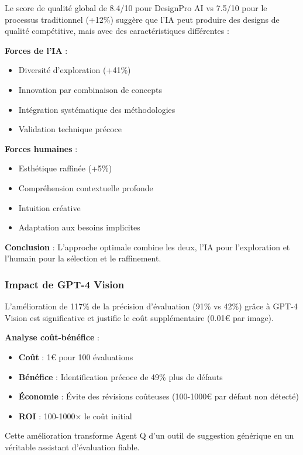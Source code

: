 Le score de qualité global de 8.4/10 pour DesignPro AI vs 7.5/10 pour le processus traditionnel (+12\%) suggère que l'IA peut produire des designs de qualité compétitive, mais avec des caractéristiques différentes :

\textbf{Forces de l'IA} :
\begin{itemize}[leftmargin=*]
    \item Diversité d'exploration (+41\%)
    \item Innovation par combinaison de concepts
    \item Intégration systématique des méthodologies
    \item Validation technique précoce
\end{itemize}

\textbf{Forces humaines} :
\begin{itemize}[leftmargin=*]
    \item Esthétique raffinée (+5\%)
    \item Compréhension contextuelle profonde
    \item Intuition créative
    \item Adaptation aux besoins implicites
\end{itemize}

\textbf{Conclusion} : L'approche optimale combine les deux, l'IA pour l'exploration et l'humain pour la sélection et le raffinement.

\subsubsection{Impact de GPT-4 Vision}

L'amélioration de 117\% de la précision d'évaluation (91\% vs 42\%) grâce à GPT-4 Vision est significative et justifie le coût supplémentaire (0.01€ par image).

\textbf{Analyse coût-bénéfice} :
\begin{itemize}[leftmargin=*]
    \item \textbf{Coût} : 1€ pour 100 évaluations
    \item \textbf{Bénéfice} : Identification précoce de 49\% plus de défauts
    \item \textbf{Économie} : Évite des révisions coûteuses (100-1000€ par défaut non détecté)
    \item \textbf{ROI} : 100-1000× le coût initial
\end{itemize}

Cette amélioration transforme Agent Q d'un outil de suggestion générique en un véritable assistant d'évaluation fiable.

